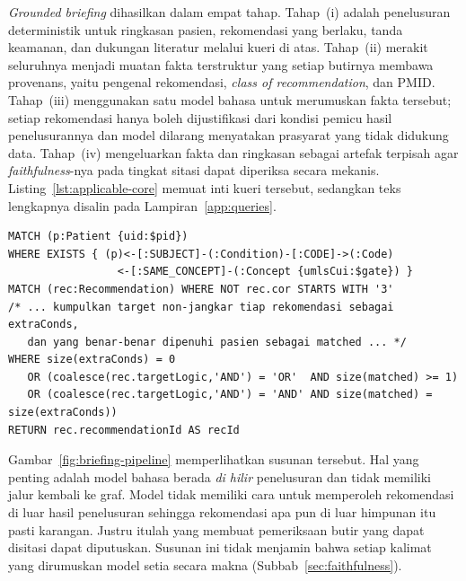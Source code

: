 \emph{Grounded briefing} dihasilkan dalam empat tahap. Tahap~(i) adalah penelusuran
deterministik untuk ringkasan pasien, rekomendasi yang berlaku, tanda keamanan, dan dukungan
literatur melalui kueri di atas. Tahap~(ii) merakit seluruhnya menjadi muatan fakta
terstruktur yang setiap butirnya membawa provenans, yaitu pengenal rekomendasi,
\emph{class of recommendation}, dan PMID. Tahap~(iii) menggunakan satu model bahasa untuk
merumuskan fakta tersebut; setiap rekomendasi hanya boleh dijustifikasi dari kondisi pemicu
hasil penelusurannya dan model dilarang menyatakan prasyarat yang tidak didukung data.
Tahap~(iv) mengeluarkan fakta dan ringkasan sebagai artefak terpisah agar
\emph{faithfulness}-nya pada tingkat sitasi dapat diperiksa secara mekanis.
Listing~\ref{lst:applicable-core} memuat inti kueri tersebut, sedangkan teks lengkapnya
disalin pada Lampiran~\ref{app:queries}.
\begin{lstlisting}[caption={Inti kueri rekomendasi yang dapat diberlakukan menggunakan gerbang CCD, yang kemudian dilakukan pencocokan
target menurut tanda konjungsi/disjungsi milik rekomendasi itu sendiri.},
label={lst:applicable-core}]
MATCH (p:Patient {uid:$pid})
WHERE EXISTS { (p)<-[:SUBJECT]-(:Condition)-[:CODE]->(:Code)
                 <-[:SAME_CONCEPT]-(:Concept {umlsCui:$gate}) }
MATCH (rec:Recommendation) WHERE NOT rec.cor STARTS WITH '3'
/* ... kumpulkan target non-jangkar tiap rekomendasi sebagai extraConds,
   dan yang benar-benar dipenuhi pasien sebagai matched ... */
WHERE size(extraConds) = 0
   OR (coalesce(rec.targetLogic,'AND') = 'OR'  AND size(matched) >= 1)
   OR (coalesce(rec.targetLogic,'AND') = 'AND' AND size(matched) = size(extraConds))
RETURN rec.recommendationId AS recId
\end{lstlisting}

Gambar~\ref{fig:briefing-pipeline} memperlihatkan susunan tersebut. Hal yang penting adalah
model bahasa berada \emph{di hilir} penelusuran dan tidak memiliki jalur kembali ke graf.
Model tidak memiliki cara untuk memperoleh rekomendasi di luar hasil penelusuran sehingga
rekomendasi apa pun di luar himpunan itu pasti karangan. Justru itulah yang membuat
pemeriksaan butir yang dapat disitasi dapat diputuskan. Susunan ini tidak menjamin bahwa
setiap kalimat yang dirumuskan model setia secara makna (Subbab~\ref{sec:faithfulness}).

